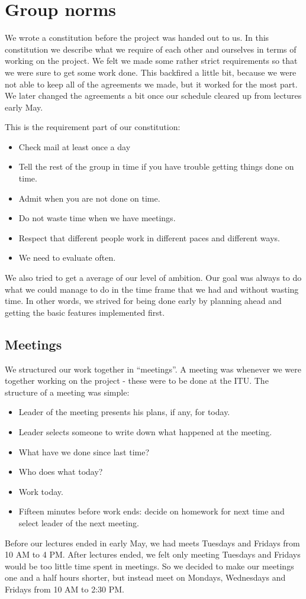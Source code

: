 \chapter{Group norms}
\label{GN}
We wrote a constitution before the project was handed out to us. In this
constitution we describe what we require of each other and ourselves in terms of
working on the project. We felt we made some rather strict requirements so that
we were sure to get some work done. This backfired a little bit, because we were
not able to keep all of the agreements we made, but it worked for the most part.
We later changed the agreements a bit once our schedule cleared up from lectures
early May.

This is the requirement part of our constitution:
\begin{itemize}
  \item Check mail at least once a day
  \item Tell the rest of the group in time if you have trouble getting things done on
  time.
  \item Admit when you are not done on time.
  \item Do not waste time when we have meetings.
  \item Respect that different people work in different paces and different
  ways.
  \item We need to evaluate often.
\end{itemize}

We also tried to get a average of our level of ambition. Our goal was always to
do what we could manage to do in the time frame that we had and without wasting
time. In other words, we strived for being done early by planning ahead and
getting the basic features implemented first.

\section{Meetings}
\label{GN-M}
We structured our work together in ``meetings''. A meeting was whenever we were
together working on the project - these were to be done at the ITU. The
structure of a meeting was simple:
\begin{itemize}
  \item Leader of the meeting presents his plans, if any, for today. 
  \item Leader selects someone to write down what happened at the meeting.
  \item What have we done since last time?
  \item Who does what today?
  \item Work today.
  \item Fifteen minutes before work ends: decide on homework for next time and
  select leader of the next meeting.
\end{itemize}
Before our lectures ended in early May, we had meets Tuesdays and Fridays from
10 AM to 4 PM. After lectures ended, we felt only meeting Tuesdays and Fridays
would be too little time spent in meetings. So we decided to make our meetings
one and a half hours shorter, but instead meet on Mondays, Wednesdays and
Fridays from 10 AM to 2:30 PM.